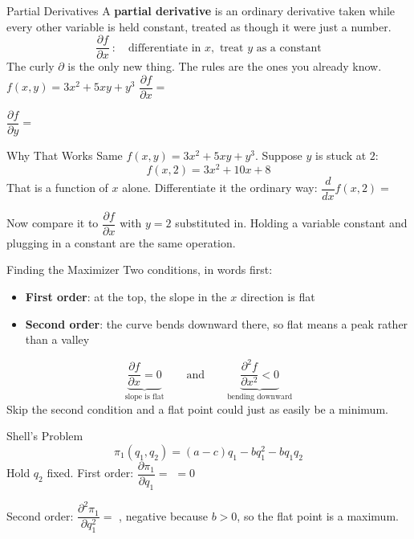 \begin{frame}{Partial Derivatives}
A \textbf{partial derivative} is an ordinary derivative taken while every other variable
is held constant, treated as though it were just a number.
\bsk
$$\frac{\partial f}{\partial x}\ :\quad \text{differentiate in } x, \text{ treat } y
\text{ as a constant}$$
\bsk
The curly $\partial$ is the only new thing. The rules are the ones you already know.
\vfill
$f(x,y)=3x^2+5xy+y^3$
\bsk
$\dfrac{\partial f}{\partial x}=$ \underline{\hspace{2in}} \vspace{0.4in}

$\dfrac{\partial f}{\partial y}=$ \underline{\hspace{2in}} \vspace{0.3in}
\end{frame}

\begin{frame}{Why That Works}
Same $f(x,y)=3x^2+5xy+y^3$. Suppose $y$ is stuck at $2$:
$$f(x,2)=3x^2+10x+8$$
\bsk
That is a function of $x$ alone. Differentiate it the ordinary way:
\bsk
$\dfrac{d}{dx}f(x,2)=$ \underline{\hspace{2in}} \vspace{0.5in}

Now compare it to $\dfrac{\partial f}{\partial x}$ with $y=2$ substituted in.
\vfill
Holding a variable constant and plugging in a constant are the same operation.
\vspace{0.5in}
\end{frame}

\begin{frame}{Finding the Maximizer}
Two conditions, in words first:
\begin{itemize}
    \item \textbf{First order}: at the top, the slope in the $x$ direction is flat
    \item \textbf{Second order}: the curve bends downward there, so flat means a peak
      rather than a valley
\end{itemize}
\bsk
$$\underbrace{\frac{\partial f}{\partial x}=0}_{\text{slope is flat}}
\qquad\text{and}\qquad
\underbrace{\frac{\partial^2 f}{\partial x^2}<0}_{\text{bending downward}}$$
\vfill
Skip the second condition and a flat point could just as easily be a minimum.
\vspace{0.7in}
\end{frame}

\begin{frame}{Shell's Problem}
$$\pi_1(q_1,q_2)=(a-c)q_1-bq_1^2-bq_1q_2$$
\bsk
Hold $q_2$ fixed. First order:
\bsk
$\dfrac{\partial \pi_1}{\partial q_1}=$ \underline{\hspace{2.2in}} $=0$ \vspace{0.6in}

Second order:
\bsk
$\dfrac{\partial^2 \pi_1}{\partial q_1^2}=$ \underline{\hspace{1.2in}}, negative because
$b>0$, so the flat point is a maximum. \vspace{0.4in}
\end{frame}

